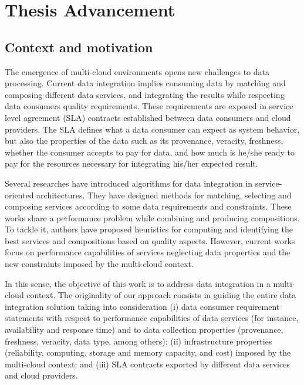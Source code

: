 \chapter{Thesis Advancement}
\label{chap:context}
\minitoc

\section{Context and motivation}
%
The emergence of multi-cloud environments opens new challenges to data processing.
%
Current data integration implies consuming data by matching and composing different data services, and integrating the results while respecting data consumers quality requirements. 
%
These requirements are exposed in service level agreement (SLA) contracts 
established between data consumers and cloud providers.
%
The SLA defines what a data consumer can expect as system behavior, 
but also the properties of the data such as its provenance, veracity, freshness, whether the consumer accepts to pay for data, and how much is he/she ready to pay for the resources necessary for integrating his/her expected result. 

%
Several researches have introduced algorithms for data integration in 
service-oriented architectures.
%
They have designed methods for matching, selecting and composing services
according to some data requirements and constraints. 
%
These works share a performance problem while 
combining and producing compositions.
%
To tackle it, authors have proposed heuristics for computing and identifying
the best services and compositions based on quality aspects.
%
However, current works focus on performance capabilities of services neglecting
data properties and the new constraints imposed by the multi-cloud context. 

%
In this sense, the objective of this work is to address data integration in a 
multi-cloud context. 
%
The originality of our approach consists in guiding the entire data integration
solution taking into consideration
(i) data consumer requirement statements with respect to performance capabilities 
of data services (for instance, availability and response time) and to data collection
properties (provenance, freshness, veracity, data type, among others); 
(ii) infrastructure properties (reliability, computing, storage and memory capacity, and cost) imposed by the multi-cloud context; and
(iii) SLA contracts exported by different data services and cloud providers.
%
%
%

